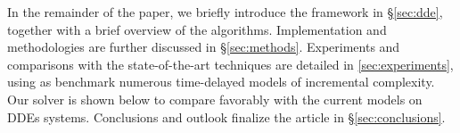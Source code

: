 In the remainder of the paper, we briefly introduce the framework in \S{}\ref{sec:dde}, together with a brief overview of the algorithms. Implementation and methodologies are further discussed in \S{}\ref{sec:methods}. Experiments and comparisons with the state-of-the-art techniques are detailed in \ref{sec:experiments}, using as benchmark numerous time-delayed models of incremental complexity. Our solver is shown below to compare favorably with the current models on DDEs systems. Conclusions and outlook finalize the article in \S{}\ref{sec:conclusions}.